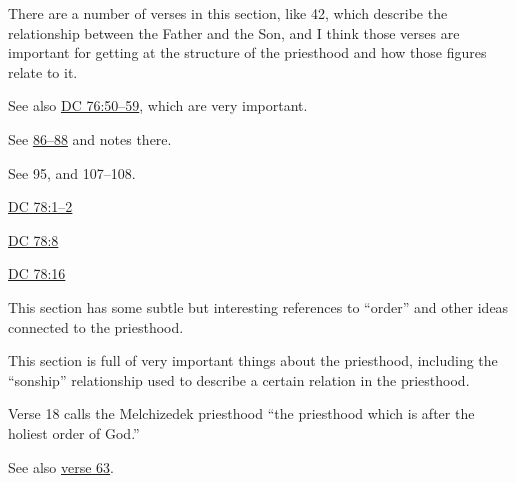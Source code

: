 \begin{compactdesc}
\begin{compactitem}
				\end{compactitem} 
			\item[{\hyperref[DC76]{DC 76}}] \phantom{.}
				\begin{compactitem}
					\item There are a number of verses in this section, like 42, which describe the relationship between the Father and the Son, and I think those verses are important for getting at the structure of the priesthood and how those figures relate to it.
					\item See also \hyperref[DC76-50]{DC 76:50--59}, which are very important.
					\item See \hyperref[DC76-86]{86--88} and notes there.
					\item See 95, and 107--108.
				\end{compactitem}
			\item[{\hyperref[DC77-3]{DC 77:3}}]
			\item[{\hyperref[DC77-11]{DC 77:11}}]
			\item[{\hyperref[DC78]{DC 78}}] \phantom{.}
				\begin{compactitem}
					\item \hyperref[DC78-1]{DC 78:1--2}
					\item \hyperref[DC78-8]{DC 78:8}
					\item \hyperref[DC78-16]{DC 78:16}
					\item This section has some subtle but interesting references to ``order'' and other ideas connected to the priesthood.
				\end{compactitem}
			\item[{\hyperref[DC81-1]{DC 81:1--2}}]
			\item[{\hyperref[DC82-3]{DC 82:3--4}}]
			\item[{\hyperref[DC82-10]{DC 82:10, 15}}]
			\item[{\hyperref[DC82-17]{DC 82:17--21}}]
			\item[{\hyperref[DC84-1]{DC 84:1--61}}] \phantom{.}
				\begin{compactitem}
					\item This section is full of very important things about the priesthood, including the ``sonship'' relationship used to describe a certain relation in the priesthood.
					\item Verse 18 calls the Melchizedek priesthood ``the priesthood which is after the holiest order of God.''
					\item See also \hyperref[DC84-63]{verse 63}.
				\end{compactitem}

\end{compactdesc}
